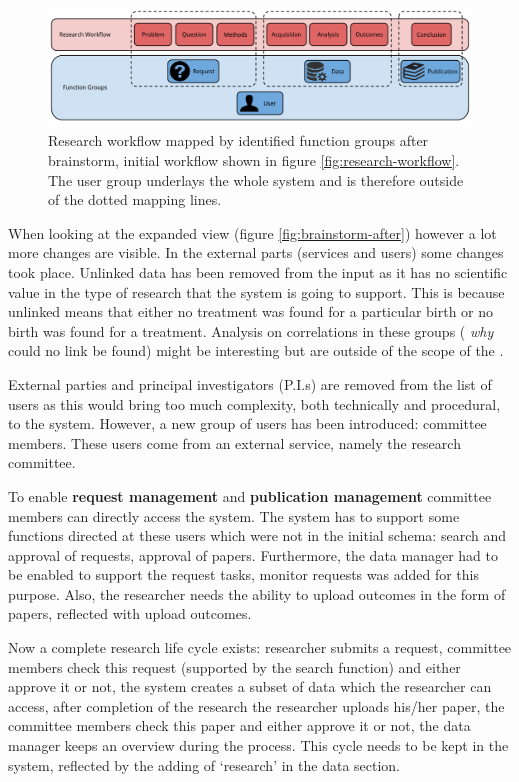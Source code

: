 \begin{figure}[hb]
	\centering
	\includegraphics[width=1.0\linewidth]{images/research-workflow-after}
	\caption{
		Research workflow mapped by identified function groups after brainstorm, initial workflow shown in figure \ref{fig:research-workflow}.
		The user group underlays the whole system and is therefore outside of the dotted mapping lines.
	}
	\label{fig:workflow-after}
\end{figure}

When looking at the expanded view (figure \ref{fig:brainstorm-after}) however a lot more changes are visible.
In the external parts (services and users) some changes took place.
Unlinked data has been removed from the input as it has no scientific value in the type of research that the system is going to support.
This is because unlinked means that either no treatment was found for a particular birth or no birth was found for a treatment.
Analysis on correlations in these groups (\ie{} \emph{why} could no link be found) might be interesting but are outside of the scope of the \project{}.

External parties and principal investigators (P.I.s) are removed from the list of users as this would bring too much complexity, both technically and procedural, to the system.
However, a new group of users has been introduced: committee members.
These users come from an external service, namely the research committee.

To enable \textbf{request management} and \textbf{publication management} committee members can directly access the system.
The system has to support some functions directed at these users which were not in the initial schema: search and approval of requests, approval of papers.
Furthermore, the data manager had to be enabled to support the request tasks, monitor requests was added for this purpose.
Also, the researcher needs the ability to upload outcomes in the form of papers, reflected with upload outcomes.

Now a complete research life cycle exists: researcher submits a request, committee members check this request (supported by the search function) and either approve it or not, the system creates a subset of data which the researcher can access, after completion of the research the researcher uploads his/her paper, the committee members check this paper and either approve it or not, the data manager keeps an overview during the process.
This cycle needs to be kept in the system, reflected by the adding of `research' in the data section.

